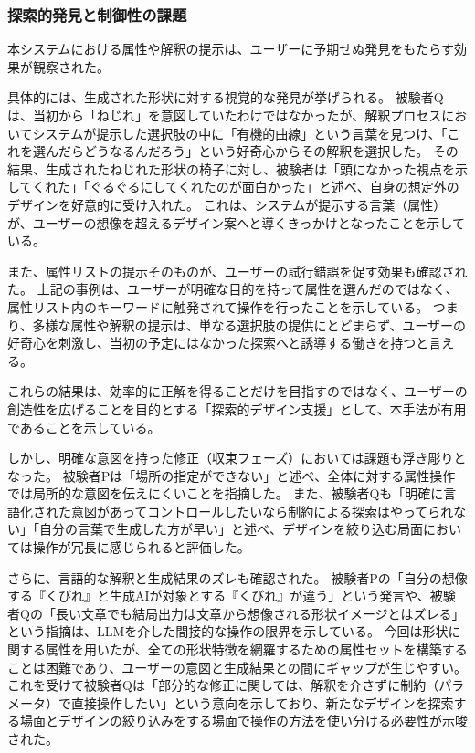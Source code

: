 \documentclass{kuisthesis}
\begin{document}
\subsubsection{探索的発見と制御性の課題}
本システムにおける属性や解釈の提示は、ユーザーに予期せぬ発見をもたらす効果が観察された。

具体的には、生成された形状に対する視覚的な発見が挙げられる。
被験者Qは、当初から「ねじれ」を意図していたわけではなかったが、解釈プロセスにおいてシステムが提示した選択肢の中に「有機的曲線」という言葉を見つけ、「これを選んだらどうなるんだろう」という好奇心からその解釈を選択した。
その結果、生成されたねじれた形状の椅子に対し、被験者は「頭になかった視点を示してくれた」「ぐるぐるにしてくれたのが面白かった」と述べ、自身の想定外のデザインを好意的に受け入れた。
これは、システムが提示する言葉（属性）が、ユーザーの想像を超えるデザイン案へと導くきっかけとなったことを示している。

また、属性リストの提示そのものが、ユーザーの試行錯誤を促す効果も確認された。
上記の事例は、ユーザーが明確な目的を持って属性を選んだのではなく、属性リスト内のキーワードに触発されて操作を行ったことを示している。
つまり、多様な属性や解釈の提示は、単なる選択肢の提供にとどまらず、ユーザーの好奇心を刺激し、当初の予定にはなかった探索へと誘導する働きを持つと言える。

これらの結果は、効率的に正解を得ることだけを目指すのではなく、ユーザーの創造性を広げることを目的とする「探索的デザイン支援」として、本手法が有用であることを示している。

しかし、明確な意図を持った修正（収束フェーズ）においては課題も浮き彫りとなった。
被験者Pは「場所の指定ができない」と述べ、全体に対する属性操作では局所的な意図を伝えにくいことを指摘した。
また、被験者Qも「明確に言語化された意図があってコントロールしたいなら制約による探索はやってられない」「自分の言葉で生成した方が早い」と述べ、デザインを絞り込む局面においては操作が冗長に感じられると評価した。

さらに、言語的な解釈と生成結果のズレも確認された。
被験者Pの「自分の想像する『くびれ』と生成AIが対象とする『くびれ』が違う」という発言や、被験者Qの「長い文章でも結局出力は文章から想像される形状イメージとはズレる」という指摘は、LLMを介した間接的な操作の限界を示している。
今回は形状に関する属性を用いたが、全ての形状特徴を網羅するための属性セットを構築することは困難であり、ユーザーの意図と生成結果との間にギャップが生じやすい。
これを受けて被験者Qは「部分的な修正に関しては、解釈を介さずに制約（パラメータ）で直接操作したい」という意向を示しており、新たなデザインを探索する場面とデザインの絞り込みをする場面で操作の方法を使い分ける必要性が示唆された。
\end{document}
